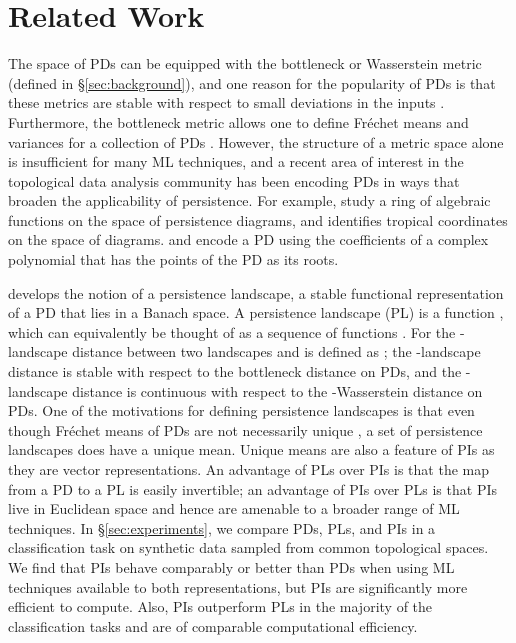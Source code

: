 \documentclass[11pt]{article}
\begin{document}
\section{Related Work}\label{sec:relatedwork}
The space of PDs can be equipped with the bottleneck or Wasserstein metric (defined in \S\ref{sec:background}), and one reason for the popularity of PDs is that these metrics are stable with respect to small deviations in the inputs \citep{stabilityPD, cohen2010lipschitz, chazal2014persistence}. Furthermore, the bottleneck metric  allows one to define Fr{\'e}chet means and variances for a collection of PDs \citep{probabilityonPD, turner2014frechet}. However, the structure of a metric space alone is insufficient for many ML techniques, and a recent area of interest in the topological data analysis community has been encoding PDs in ways that broaden the applicability of persistence. For example, \citet{adcock2012ring} study a ring of algebraic functions on the space of persistence diagrams, and \citet{verovsek2016tropical} identifies tropical coordinates on the space of diagrams. \citet{ferri1999representing} and \citet{di2015comparing} encode a PD using the coefficients of a complex polynomial that has the points of the PD as its roots. 

\citet{bubenik2015statistical} develops the notion of a persistence landscape, a stable functional representation of a PD that lies in a Banach space. A persistence landscape (PL) is a function , which can equivalently be thought of as a sequence of functions . For  the -landscape distance between two landscapes  and  is defined as ; the -landscape distance is stable with respect to the bottleneck distance on PDs, and the -landscape distance is continuous with respect to the -Wasserstein distance on PDs. One of the motivations for defining persistence landscapes is that even though Fr{\'e}chet means of PDs are not necessarily unique \citep{probabilityonPD}, a set of persistence landscapes does have a unique mean.  Unique means are also a feature of PIs as they are vector representations. An advantage of PLs  over PIs is that the map from a PD to a PL is easily invertible; an advantage of PIs over PLs is that PIs live in Euclidean space and hence are amenable to a broader range of ML techniques. In \S\ref{sec:experiments}, we compare PDs, PLs, and PIs in a classification task on synthetic data sampled from common topological spaces. We find that PIs behave comparably or better than PDs when using ML techniques available to both representations, but PIs are significantly more efficient to compute. Also, PIs outperform PLs in the majority of the classification tasks and are of comparable computational efficiency.
\end{document}
